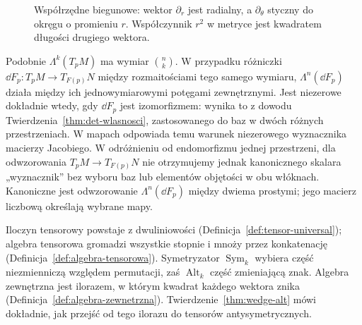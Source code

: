 \begin{figure}[H]
\centering
{}
\caption{Współrzędne biegunowe: wektor $\partial_r$ jest radialny,
a $\partial_\theta$ styczny do okręgu o promieniu $r$.
Współczynnik $r^2$ w metryce jest kwadratem długości drugiego wektora.}
\label{fig:tensor-biegunowe}
\end{figure}

Podobnie $\Lambda^k(T_pM)$ ma wymiar $\binom nk$.
W przypadku różniczki $\dd F_p\colon T_pM\to T_{F(p)}N$
między rozmaitościami tego samego wymiaru,
$\Lambda^n(\dd F_p)$ działa między ich jednowymiarowymi
potęgami zewnętrznymi. Jest niezerowe dokładnie wtedy,
gdy $\dd F_p$ jest izomorfizmem: wynika to z dowodu
Twierdzenia~\ref{thm:det-wlasnosci}, zastosowanego do baz
w dwóch różnych przestrzeniach. W mapach odpowiada temu
warunek niezerowego wyznacznika macierzy Jacobiego.
W odróżnieniu od endomorfizmu jednej przestrzeni, dla odwzorowania
$T_pM\to T_{F(p)}N$ nie otrzymujemy jednak kanonicznego skalara
„wyznacznik” bez wyboru baz lub elementów objętości w obu włóknach.
Kanoniczne jest odwzorowanie $\Lambda^n(\dd F_p)$ między
dwiema prostymi; jego macierz liczbową określają wybrane mapy.

\begin{uwaga}
Iloczyn tensorowy powstaje z dwuliniowości
(Definicja~\ref{def:tensor-universal}); algebra tensorowa
gromadzi wszystkie stopnie i mnoży przez konkatenację
(Definicja~\ref{def:algebra-tensorowa}). Symetryzator
$\operatorname{Sym}_k$ wybiera część niezmienniczą względem
permutacji, zaś $\operatorname{Alt}_k$ część zmieniającą znak.
Algebra zewnętrzna jest ilorazem, w którym kwadrat każdego
wektora znika (Definicja~\ref{def:algebra-zewnetrzna}).
Twierdzenie~\ref{thm:wedge-alt} mówi dokładnie, jak przejść
od tego ilorazu do tensorów antysymetrycznych.
\end{uwaga}

